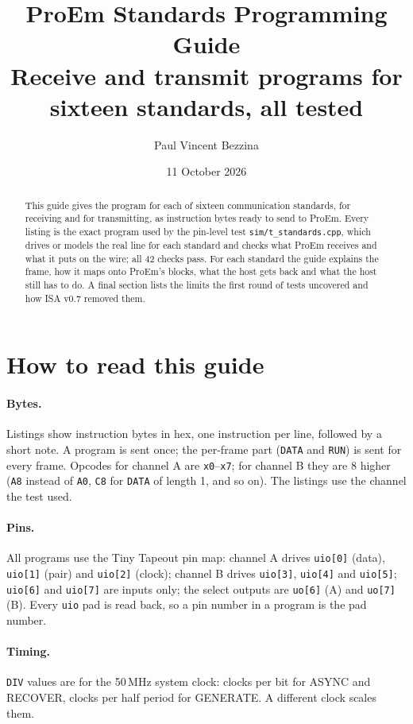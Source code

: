 \documentclass[11pt,a4paper]{article}
\title{ProEm Standards Programming Guide\\\large Receive and transmit programs for sixteen standards, all tested}
\author{Paul Vincent Bezzina}
\date{11 October 2026}
\newcommand{\sig}[1]{\texttt{#1}}
\begin{document}
\maketitle
\thispagestyle{fancy}

\begin{abstract}
This guide gives the program for each of sixteen communication standards, for receiving and for transmitting, as instruction bytes ready to send to ProEm. Every listing is the exact program used by the pin-level test \sig{sim/t\_standards.cpp}, which drives or models the real line for each standard and checks what ProEm receives and what it puts on the wire; all 42 checks pass. For each standard the guide explains the frame, how it maps onto ProEm's blocks, what the host gets back and what the host still has to do. A final section lists the limits the first round of tests uncovered and how ISA v0.7 removed them.
\end{abstract}

\tableofcontents
\newpage

\section{How to read this guide}

\paragraph{Bytes.} Listings show instruction bytes in hex, one instruction per line, followed by a short note. A program is sent once; the per-frame part (\sig{DATA} and \sig{RUN}) is sent for every frame. Opcodes for channel A are \texttt{x0}--\texttt{x7}; for channel B they are 8 higher (\texttt{A8} instead of \texttt{A0}, \texttt{C8} for \sig{DATA} of length 1, and so on). The listings use the channel the test used.

\paragraph{Pins.} All programs use the Tiny Tapeout pin map: channel A drives \sig{uio[0]} (data), \sig{uio[1]} (pair) and \sig{uio[2]} (clock); channel B drives \sig{uio[3]}, \sig{uio[4]} and \sig{uio[5]}; \sig{uio[6]} and \sig{uio[7]} are inputs only; the select outputs are \sig{uo[6]} (A) and \sig{uo[7]} (B). Every \sig{uio} pad is read back, so a pin number in a program is the pad number.

\paragraph{Timing.} \sig{DIV} values are for the 50\,MHz system clock: clocks per bit for ASYNC and RECOVER, clocks per half period for GENERATE. A different clock scales them.
\end{document}
